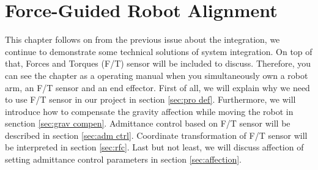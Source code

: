 \chapter{Force-Guided Robot Alignment}
This chapter follows on from the previous issue about the integration, we continue to demonstrate some technical solutions of system integration. On top of that, Forces and Torques (F/T) sensor will be included to discuss. Therefore, you can see the chapter as a operating manual when you simultaneously own a robot arm, an F/T sensor and an end effector. First of all, we will explain why we need to use F/T sensor in our project in section \ref{sec:pro def}. Furthermore, we will introduce how to compensate the gravity affection while moving the robot in senction \ref{sec:grav compen}. Admittance control based on F/T sensor will be described in section \ref{sec:adm ctrl}. Coordinate transformation of F/T sensor will be interpreted in section \ref{sec:rfc}. Last but not least, we will discuss affection of setting admittance control parameters in section \ref{sec:affection}.
